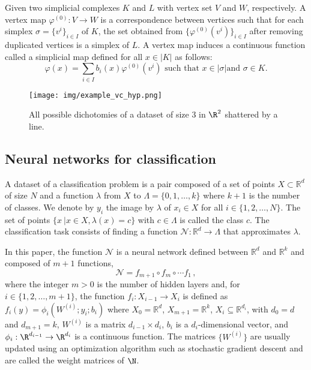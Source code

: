 Given two simplicial complexes $K$ and $L$ with vertex set $V$ and $W$, respectively. A vertex map $\varphi^{(0)}: V \rightarrow W$ is 
a correspondence between vertices
such that for each simplex  $\sigma= 
\{ v^i
\}_{i\in I}$
of $K$, 
the set obtained from $\big\{ \varphi^{\scriptscriptstyle (0)}(v^{i})\big\}_{i\in I}$ after removing duplicated vertices is a simplex of $L$.
A vertex map induces a continuous function called a simplicial map defined for all $x\in |K|$ as follows:
\[\mbox{$\varphi(x)=\sum_{i\in I}b_i(x)\varphi^{(0)}(v^i)$ such that $x\in |\sigma|$
and $\sigma\in K$}.
\]


\begin{figure}[ht]
    \centering
\texttt{[image: img/example\_vc\_hyp.png]}   
    \caption{All possible dichotomies of a dataset of size $3$ in $\R^2$ shattered by a line. 
    }
    \label{fig:example_VC}
\end{figure}


\subsection{Neural networks for classification}

A dataset 
 of a classification problem is a pair composed of a set of points $X\subset \mathbb{R}^d$ of size $N$ and a function
$\lambda$ from $X$ to $\Lambda=\{0,1,\dots, k
\}$ where $k+1$ is the number of classes. We denote by $y_i$ the image by
$\lambda$ of $x_i\in X$ for all $i\in \{1,2,\dots,N\}$. The set of points $\{x\ | x\in X, \lambda(x)=c\}$ with $c\in\Lambda$ 
 is called the class $c$. The classification task consists of finding a function $\mathcal{N}: \mathbb{R}^d \rightarrow \Lambda$ that approximates $\lambda$.  
 
 In this paper, the function $\mathcal{N}$ is
 a neural network  defined between  
 $\mathbb{R}^d$ and $\mathbb{R}^k$ and composed of $m+1$ functions, 
$$\mathcal{N}=f_{m+1}\circ f_m\circ \cdots f_1\,,$$
 where the integer $m>0$ is the number of hidden layers and, for $i \in \{1,2,\dots, m+1\}$, the function $f_i:X_{i-1}\rightarrow X_i$ is defined as $f_i(y)=\phi_i(W^{(i)};y_i;b_i)$ where $X_0=\mathbb{R}^d$, $X_{m+1}=
 \mathbb{R}^k$, 
 $X_i\subseteq \mathbb{R}^{d_i}$, 
 with $d_0=d$ and $d_{m+1}=k$, 
 $W^{(i)}$ is a matrix $d_{i-1}\times d_i$,  
 $b_i$ is a $d_i$-dimensional vector, and $\phi_i: \R^{d_{i-1}}\to \R^{d_i}$ is a continuous function. 
 The matrices $\{W^{(i)}\}$ are  usually updated using an optimization algorithm such as stochastic gradient descent and are called the 
weight matrices
 of $\N$.
    

